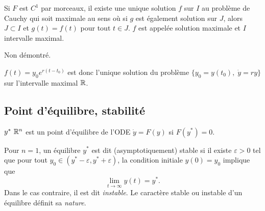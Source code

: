 \begin{theorem}
  Si $F$ est $C^1$ par morceaux, il existe une unique solution $f$ sur $I$ au problème de Cauchy qui soit maximale au sens où si $g$ est également solution sur $J$, alors $J \subset I$ et $g(t) = f(t)$ pour tout $t \in J$. $f$ est appelée solution maximale et $I$ intervalle maximal.
\end{theorem}

\proof Non démontré. \eproof

\remark
$f(t) = y_0 e^{r(t-t_0)}$ est donc l'unique solution du problème $\{y_0 = y(t_0), \; \dot y = r y\}$ sur l'intervalle maximal $\mathbb{R}$.


\subsection{Point d'équilibre, stabilité} 

\begin{definition}
  $y^* \ \mathbb{R}^n$ est un point d'équilibre de l'ODE $\dot y = F(y)$ si $F(y^*) = 0$.
\end{definition}

\begin{definition}[Stabilité ($n = 1$)]
  Pour $n = 1$, un équilibre $y^*$ est dit (asymptotiquement) stable si il existe $\varepsilon > 0$ tel que pour tout $y_0 \in (y^* - \varepsilon, y^* + \varepsilon)$, la condition initiale $y(0) = y_0$ implique que 
  $$
  \lim_{t \to \infty} y(t) = y^*.
  $$
  Dans le cas contraire, il est dit {\em instable}. Le caractère stable ou instable d'un équilibre définit sa {\em nature}.
\end{definition}

